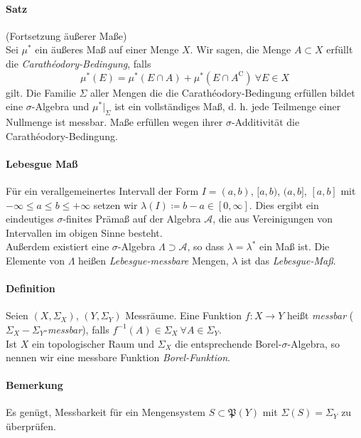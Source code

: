 \documentclass[12pt,a4paper,fleqn]{article}
\begin{document}
\paragraph{Satz} (Fortsetzung äußerer Maße)\\
Sei $\mu^*$ ein äußeres Maß auf einer Menge $X$. Wir sagen, die Menge $A \subset X$ erfüllt die \textit{Carathéodory-Bedingung}, falls 
\begin{displaymath}
\mu^*(E) = \mu^*(E\cap A) + \mu^*(E \cap A^\mathrm{C})\ \forall E \in X
\end{displaymath}
gilt. Die Familie $\Sigma$ aller Mengen die die Carathéodory-Bedingung erfüllen bildet eine $\sigma$-Algebra und $\mu^*\vert_\Sigma$ ist ein vollständiges Maß, d. h. jede Teilmenge einer Nullmenge ist messbar. Maße erfüllen wegen ihrer $\sigma$-Additivität die Carathéodory-Bedingung.

\paragraph{Lebesgue Maß} Für ein verallgemeinertes Intervall der Form $I = (a, b)$, $[a, b)$, $(a, b]$, $[a, b]$ mit \mbox{$-\infty \leq a \leq b \leq +\infty$} setzen wir $\lambda(I) \coloneqq b - a \in [0, \infty]$. Dies ergibt ein eindeutiges $\sigma$-finites Prämaß auf der Algebra $\mathcal{A}$, die aus Vereinigungen von Intervallen im obigen Sinne besteht.\\
Außerdem existiert eine $\sigma$-Algebra $\Lambda \supset \mathcal{A}$, so dass $\lambda = \lambda^*$ ein Maß ist. Die Elemente von $\Lambda$ heißen \textit{Lebesgue-messbare} Mengen, $\lambda$ ist das \textit{Lebesgue-Maß}.

\paragraph{Definition} Seien $(X, \Sigma_X)$, $(Y, \Sigma_Y)$ Messräume. Eine Funktion $f\colon X \rightarrow Y$ heißt \textit{messbar} ($\Sigma_X-\Sigma_Y$-\textit{messbar}), falls $f^{-1}(A) \in \Sigma_X \ \forall A \in \Sigma_Y$.\\
Ist $X$ ein topologischer Raum und $\Sigma_X$ die entsprechende Borel-$\sigma$-Algebra, so nennen wir eine messbare Funktion \textit{Borel-Funktion}.

\paragraph{Bemerkung} Es genügt, Messbarkeit für ein Mengensystem $S \subset \mathfrak{P}(Y)$ mit ${\Sigma(S) = \Sigma_Y}$ zu überprüfen.
\end{document}
